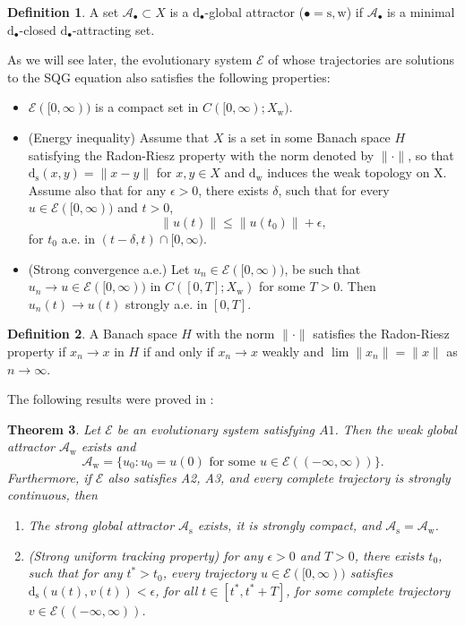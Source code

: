 \documentclass{amsart}
\newcommand{\As}{\mathcal{A}_{\mathrm{s}}}
\newcommand{\Aw}{\mathcal{A}_{\mathrm{w}}}
\newcommand{\ds}{\mathrm{d}_{\mathrm{s}}}
\newcommand{\dw}{\mathrm{d}_{\mathrm{w}}}
\newcommand{\Ec}{\mathcal{E}}
\newcommand{\Xw}{X_{\mathrm{w}}}
\newcommand{\Xs}{X_{\mathrm{s}}}
\newtheorem {Theorem}  {Theorem}
\numberwithin{Theorem}{section}
\theoremstyle{definition}
\newtheorem{Definition}[Theorem]{Definition}
\theoremstyle{remark}
\begin{document}
\begin{Definition}
A set
$\mathcal{A}_{\bullet}\subset X$ is a
$\mathrm{d}_{\bullet}$-global attractor ($\bullet = \mathrm{s,w}$) if
$\mathcal{A}_{\bullet}$ is a minimal $\mathrm{d}_{\bullet}$-closed
$\mathrm{d}_{\bullet}$-attracting  set.
\end{Definition}

As we will see later, the evolutionary system $\Ec$ of whose trajectories are solutions to the
SQG equation also satisfies the following properties:
\begin{itemize}
\item[A1] $\Ec([0,\infty))$ is a compact set in $C([0,\infty); \Xw)$.
\item[A2] (Energy inequality) Assume that $X$ is a set in some Banach space $H$ satisfying the Radon-Riesz
property with the norm denoted by $\| \cdot \|$, so that $\ds(x, y) = \|x-y\|$ for $x, y \in X$ and $\dw$ induces the weak topology on X.
Assume also that for any $\epsilon >0$, there exists $\delta$, such that
for every $u \in \Ec([0,\infty))$ and $t>0$,
\[
\|u(t)\| \leq \|u(t_0)\| + \epsilon,
\]
for $t_0$ a.e. in $(t-\delta, t)\cap[0,\infty)$.
\item[A3] (Strong convergence a.e.) Let $u_n \in \Ec([0,\infty))$, be such that
$u_n \to u\in\Ec([0,\infty))$ in $C([0, T];\Xw)$ for some $T>0$. Then
$u_n(t) \to u(t)$ strongly a.e. in $[0,T]$.
\end{itemize}

\begin{Definition}
A Banach space $H$ with the norm $\|\cdot\|$ satisfies the Radon-Riesz property
if $x_n \to x$ in $H$  if and only if $x_n \to x$ weakly and $\lim \|x_n\| = \|x\|$ as $n \to \infty$.
\end{Definition}

The following results were proved in \cite{C5}:
\begin{Theorem} \label{thm:Attractor}
Let $\Ec$ be an evolutionary system satisfying $A1$. Then
the weak global attractor $\Aw$ exists and
\[
\Aw=\{u_0: u_0 =u(0) \mbox { for some } u\in \Ec((-\infty,\infty))\}.
\]
Furthermore, if $\Ec$ also satisfies A2, A3, and every complete trajectory is strongly continuous, then
\begin{enumerate}
\item The strong global attractor $\As$ exists, it is strongly compact, and $\As = \Aw$.
\item (Strong uniform tracking property) for any $\epsilon > 0$ and $T > 0$, there exists $t_0$, such that for any $t^* > t_0$, every trajectory
 $u\in\Ec([0,\infty))$ satisfies $\ds(u(t), v(t)) < \epsilon$, for all $t \in [t^*, t^* +T ]$, for some complete trajectory $v \in \Ec ((-\infty, \infty))$.
\end{enumerate}
\end{Theorem}
\end{document}
